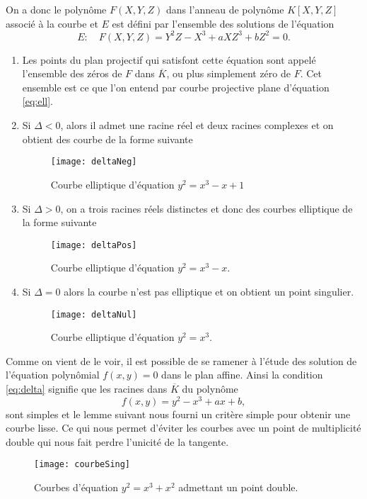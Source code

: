 
On a donc le polynôme $F(X,Y,Z)$ dans l'anneau de polynôme $K[X,Y,Z]$ associé à la courbe et
$E$ est défini par l'ensemble des solutions de l'équation 
\[
E:\quad F(X,Y,Z) = Y^2Z-X^3+aXZ^3+bZ^2 = 0
.\] 

\begin{remarque}
    \begin{enumerate}
        \item 
Les points du plan projectif qui satisfont cette équation sont appelé l'ensemble des zéros
de $F$ dans $\overline{K}$, ou plus simplement zéro de $F$. Cet ensemble est ce que l'on
entend par courbe projective plane d'équation \eqref{eq:ell}. 
        \item Si $\Delta<0$, alors il
            admet une racine réel et deux racines complexes et on obtient des courbe de la
            forme suivante
            \begin{figure}[h]
                \centering
                \texttt{[image: deltaNeg]}
                \caption{Courbe elliptique d'équation $y^2 = x^3 - x + 1$}
                \label{fig:deltaNeg}
            \end{figure}
        \item Si $\Delta > 0$, on a trois racines réels distinctes et donc des courbes
            elliptique de la forme suivante
            \begin{figure}[h]
                \centering
                \texttt{[image: deltaPos]}
                \caption{Courbe elliptique d'équation $y^2 = x^3 - x$.}
                \label{fig:deltaPos}
            \end{figure}

        \item Si $\Delta = 0$ alors la courbe n'est pas elliptique et on obtient un point
            singulier.
            \begin{figure}[h]
                \centering
                \texttt{[image: deltaNul]}
                \caption{Courbe elliptique d'équation $y^2 = x^3$.}
                \label{fig:deltaNul}
            \end{figure}
    \end{enumerate}
\end{remarque}

Comme on vient de le voir, il est possible de se ramener à l'étude
des solution de l'équation
polynômial $f(x,y) = 0$ dans le plan affine. Ainsi la condition \eqref{eq:delta}
signifie que les racines dans $\overline{K}$ du polynôme
\[
f(x,y) = y^2 - x^3 + ax + b
,\] 
sont simples et le lemme suivant nous fourni un critère simple pour obtenir une courbe
lisse. Ce qui nous permet d'éviter les courbes avec un point de multiplicité double qui nous
fait perdre l'unicité de la tangente.
\begin{figure}[h]
    \centering
    \texttt{[image: courbeSing]}
    \caption{Courbes d'équation $y^2 = x^3 + x^2$ admettant un point double.}
    \label{fig:courbeSing}
\end{figure}

